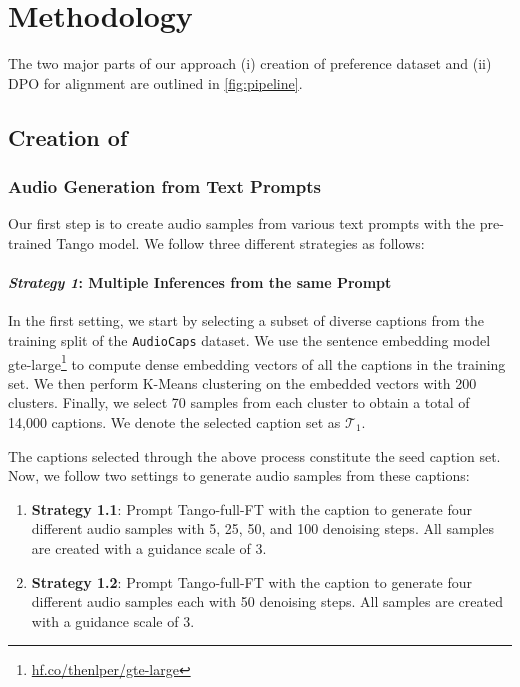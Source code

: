 \section{Methodology}

The two major parts of our approach (i) creation of preference dataset \dataset{} and (ii) DPO for alignment are outlined in \cref{fig:pipeline}.

\subsection{Creation of \dataset{}}
\label{sec:pref-dataset}

\subsubsection{Audio Generation from Text Prompts}

Our first step is to create audio samples from various text prompts with the pre-trained Tango model. We follow three different strategies as follows:

\paragraph{\bf \textit{Strategy 1}: Multiple Inferences from the same Prompt} In the first setting, we start by selecting a subset of diverse captions from the training split of the \texttt{AudioCaps} dataset. We use the sentence embedding model \textsf{gte-large}\footnote{\url{hf.co/thenlper/gte-large}} \cite{li2023towards} to compute dense embedding vectors of all the captions in the training set. We then perform K-Means clustering on the embedded vectors with 200 clusters. Finally, we select 70 samples from each cluster to obtain a total of 14,000 captions. We denote the selected caption set as $\mathcal{T}_1$.

The captions selected through the above process constitute the seed caption set. 
Now, we follow two settings to generate audio samples from these captions:

\begin{enumerate}
    \item \textbf{Strategy 1.1}: Prompt \textsf{Tango-full-FT} with the caption to generate four different audio samples with 5, 25, 50, and 100 denoising steps. All samples are created with a guidance scale of 3. 

    \item \textbf{Strategy 1.2}: Prompt \textsf{Tango-full-FT} with the caption to generate four different audio samples each with 50 denoising steps. All samples are created with a guidance scale of 3.
    
\end{enumerate}

